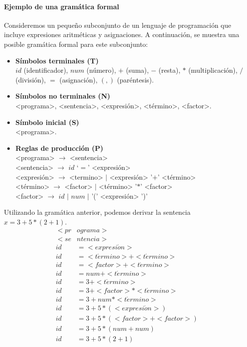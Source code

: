 \paragraph{Ejemplo de una gramática formal}
Consideremos un pequeño subconjunto de un lenguaje de programación que incluye expresiones aritméticas y asignaciones. A continuación, se muestra una posible gramática formal para este subconjunto:
\begin{itemize}
  \item \textbf{Símbolos terminales (T)} \\
  $id$ (identificador), $num$ (número), $+$ (suma), $-$ (resta), $*$ (multiplicación), $/$ (división), $=$ (asignación), $(, )$ (paréntesis).
  \item \textbf{Símbolos no terminales (N)} \\
  <programa>, <sentencia>, <expresión>, <término>, <factor>.
  \item \textbf{Símbolo inicial (S)} \\
  <programa>.
  \item \textbf{Reglas de producción (P)} \\
  <programa> $\rightarrow$ <sentencia> \\
  <sentencia> $\rightarrow$ $id$ `$=$' <expresión> \\
  <expresión> $\rightarrow$ <termino> \space $|$ <expresión> '$+$' <término> \\
  <término> $\rightarrow$ <factor> \space $|$ <término> '$*$' <factor> \\
  <factor> $\rightarrow$ $id$ \space $|$ $num$ \space $|$ '(' <expresión> ')'
\end{itemize}

Utilizando la gramática anterior, podemos derivar la sentencia $x = 3 + 5 * (2 + 1)$.
\begin{equation*}
  \begin{split}
    <pr&ograma> \\
    <se&ntencia> \\
    id & = <expresi\acute{o}n> \\
    id & = <t\acute{e}rmino> + <t\acute{e}rmino> \\
    id & = <factor> + <t\acute{e}rmino> \\
    id & = num + <t\acute{e}rmino> \\
    id & = 3 + <t\acute{e}rmino> \\
    id & = 3 + <factor> * <t\acute{e}rmino> \\
    id & = 3 + num * <t\acute{e}rmino> \\
    id & = 3 + 5 * ( <expresi\acute{o}n> ) \\
    id & = 3 + 5 * ( <factor> + <factor> ) \\
    id & = 3 + 5 * ( num + num) \\
    id & = 3 + 5 * ( 2 + 1 )
  \end{split}
\end{equation*}

